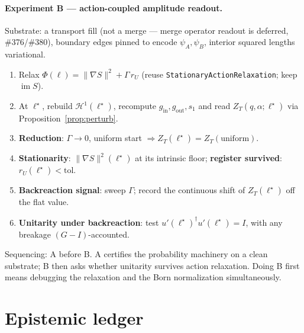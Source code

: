 \documentclass[11pt]{article}
\DeclareMathOperator{\im}{im}
\newcommand{\norm}[1]{\lVert #1 \rVert}
\newcommand{\harm}{\mathcal{H}}              %
\newcommand{\gin}{g_{\mathrm{in}}}
\newcommand{\gout}{g_{\mathrm{out}}}
\newcommand{\ZT}{Z_{T}}
\newcommand{\rU}{r_{U}}
\newcommand{\code}[1]{\texttt{#1}}
\theoremstyle{plain}
\theoremstyle{definition}
\begin{document}
\paragraph{Experiment B --- action-coupled amplitude readout.}
Substrate: a transport fill (not a merge --- merge operator readout is deferred, \#376/\#380),
boundary edges pinned to encode $\psi_A,\psi_B$, interior squared lengths variational.
\begin{enumerate}[nosep]
  \item Relax $\Phi(\ell)=\norm{\nabla S}^2+\Gamma\,\rU$ (reuse \code{StationaryActionRelaxation};
        keep $\im S$).
  \item At $\ell^\star$, rebuild $\harm^1(\ell^\star)$, recompute $\gin,\gout,s_1$ and read
        $\ZT(q,\alpha;\ell^\star)$ via Proposition~\ref{prop:perturb}.
  \item \textbf{Reduction}: $\Gamma\to0$, uniform start $\Rightarrow \ZT(\ell^\star)=\ZT(\text{uniform})$.
  \item \textbf{Stationarity}: $\norm{\nabla S}^2(\ell^\star)$ at its intrinsic floor;
        \textbf{register survived}: $\rU(\ell^\star)<\text{tol}$.
  \item \textbf{Backreaction signal}: sweep $\Gamma$; record the continuous shift of
        $\ZT(\ell^\star)$ off the flat value.
  \item \textbf{Unitarity under backreaction}: test $u'(\ell^\star)^\dagger u'(\ell^\star)=I$, with
        any breakage $(G-I)$-accounted.
\end{enumerate}
Sequencing: A before B. A certifies the probability machinery on a clean substrate; B then asks
whether unitarity survives action relaxation. Doing B first means debugging the relaxation and
the Born normalization simultaneously.

\section{Epistemic ledger}
\label{sec:ledger}
\end{document}
